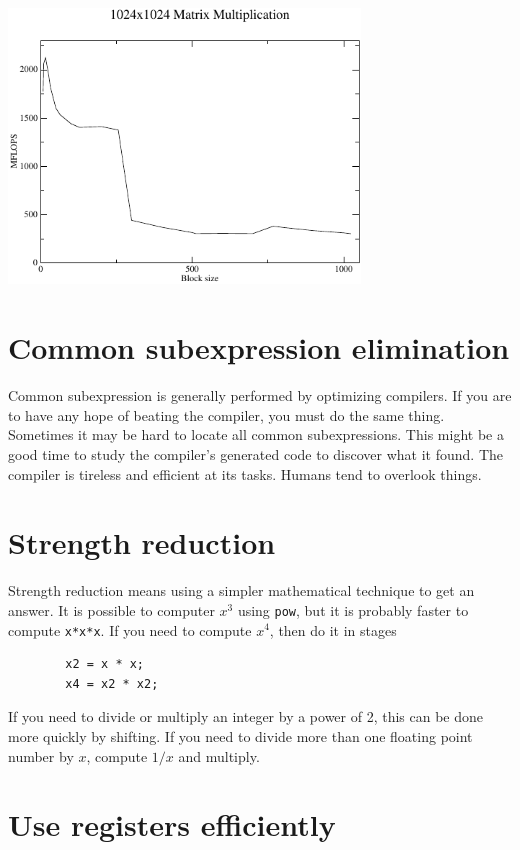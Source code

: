 \documentclass[11pt,b5paper]{book}
\begin{document}
\begin{center}
\includegraphics[width=0.7\textwidth]{mm.pdf}
\end{center}

\section{Common subexpression elimination}

Common subexpression is generally performed by optimizing compilers.
If you are to have any hope of beating the compiler, you must do the same thing.
Sometimes it may be hard to locate all common subexpressions.
This might be a good time to study the compiler's generated code to discover
what it found.
The compiler is tireless and efficient at its tasks.
Humans tend to overlook things.

\section{Strength reduction}

Strength reduction means using a simpler mathematical technique to get an
answer.
It is possible to computer $x^3$ using {\tt pow}, but it is probably faster
to compute {\tt x*x*x}.
If you need to compute $x^4$, then do it in stages
\begin{verbatim}
        x2 = x * x;
        x4 = x2 * x2;
\end{verbatim}
If you need to divide or multiply an integer by a power of 2, this can be done
more quickly by shifting.
If you need to divide more than one floating point number by $x$,
compute $1/x$ and multiply.


\section{Use registers efficiently}
\end{document}
